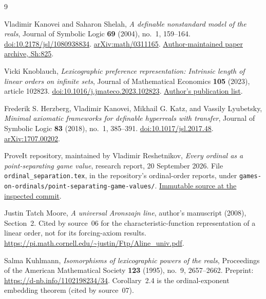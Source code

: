 \documentclass[11pt,a4paper]{article}
\theoremstyle{definition}
\theoremstyle{remark}
\begin{document}
\begin{thebibliography}{9}
\raggedright
{}

Vladimir Kanovei and Saharon Shelah,
\emph{A definable nonstandard model of the reals},
Journal of Symbolic Logic \textbf{69} (2004), no.~1, 159--164.
\href{https://doi.org/10.2178/jsl/1080938834}{doi:10.2178/jsl/1080938834}.
\href{https://arxiv.org/abs/math/0311165}{arXiv:math/0311165}.
\href{https://shelah.logic.at/papers/825/}{Author-maintained paper archive, Sh:825}.

Vicki Knoblauch,
\emph{Lexicographic preference representation: Intrinsic length of linear
orders on infinite sets},
Journal of Mathematical Economics \textbf{105} (2023), article 102823.
\href{https://doi.org/10.1016/j.jmateco.2023.102823}{doi:10.1016/j.jmateco.2023.102823}.
\href{https://vickiknoblauch.com/research.html}{Author's publication list}.

Frederik S. Herzberg, Vladimir Kanovei, Mikhail G. Katz, and Vassily Lyubetsky,
\emph{Minimal axiomatic frameworks for definable hyperreals with transfer},
Journal of Symbolic Logic \textbf{83} (2018), no.~1, 385--391.
\href{https://doi.org/10.1017/jsl.2017.48}{doi:10.1017/jsl.2017.48}.
\href{https://arxiv.org/abs/1707.00202}{arXiv:1707.00202}.

ProveIt repository, maintained by Vladimir Reshetnikov,
\emph{Every ordinal as a point-separating game value}, research report,
20 September 2026. File \texttt{ordinal\_separation.tex}, in the
repository's ordinal-order reports, under
\texttt{games-on-ordinals/point-separating-game-values/}.
\href{https://github.com/VladimirReshetnikov/ProveIt/blob/6ea60e3677bd847a00baf023c3c532c83884530e/SetTheory/Cardinals/docs/reports/ordinals-and-order-types/games-on-ordinals/point-separating-game-values/ordinal_separation.tex}{Immutable source at the inspected commit}.

Justin Tatch Moore,
\emph{A universal Aronszajn line}, author's manuscript (2008), Section~2.
Cited by source~06 for the characteristic-function representation of a
linear order, not for its forcing-axiom results.
\url{https://pi.math.cornell.edu/~justin/Ftp/Aline_univ.pdf}.

Salma Kuhlmann,
\emph{Isomorphisms of lexicographic powers of the reals},
Proceedings of the American Mathematical Society \textbf{123} (1995),
no.~9, 2657--2662.
Preprint: \url{https://d-nb.info/1102198234/34}.
Corollary~2.4 is the ordinal-exponent embedding theorem (cited by source~07).


\end{thebibliography}
\end{document}
